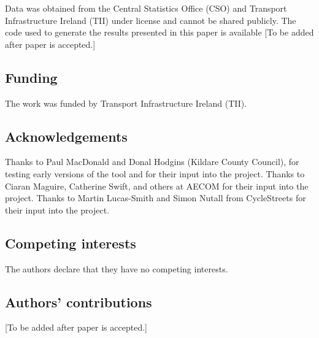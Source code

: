 \documentclass[
  super,
  preprint,
  3p]{elsarticle}
\begin{document}
Data was obtained from the Central Statistics Office (CSO) and Transport
Infrastructure Ireland (TII) under license and cannot be shared
publicly. The code used to generate the results presented in this paper
is available {[}To be added after paper is accepted.{]}

\hypertarget{funding}{%
\subsection*{Funding}\label{funding}}

The work was funded by Transport Infrastructure Ireland (TII).

\hypertarget{acknowledgements}{%
\subsection*{Acknowledgements}\label{acknowledgements}}

Thanks to Paul MacDonald and Donal Hodgins (Kildare County Council), for
testing early versions of the tool and for their input into the project.
Thanks to Ciaran Maguire, Catherine Swift, and others at AECOM for their
input into the project. Thanks to Martin Lucas-Smith and Simon Nutall
from CycleStreets for their input into the project.

\hypertarget{competing-interests}{%
\subsection*{Competing interests}\label{competing-interests}}

The authors declare that they have no competing interests.

\hypertarget{authors-contributions}{%
\subsection*{Authors' contributions}\label{authors-contributions}}

{[}To be added after paper is accepted.{]}


  
\end{document}

